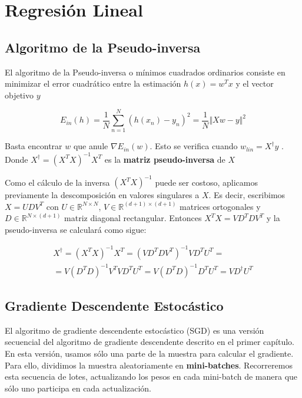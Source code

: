 \chapter{Regresión Lineal}

\section{Algoritmo de la Pseudo-inversa}
El algoritmo de la Pseudo-inversa o mínimos cuadrados ordinarios consiste
en minimizar el error cuadrático entre la estimación $h(x) = w^T x$ y
el vector objetivo $y$

\begin{equation}
E_{in}(h) = \frac{1}{N} \sum_{n=1}^N (h(x_n) - y_n)^2 = \frac{1}{N} \Vert Xw - y\Vert^2
\end{equation}

Basta encontrar $w$ que anule $\nabla E_{in}(w)$. Esto se verifica cuando
$w_{lin} = X^\dagger y$ \cite{LFD}. Donde $X^\dagger = (X^T X)^{-1} X^T$ es la
\textbf{matriz pseudo-inversa} de $X$

Como el cálculo de la inversa $(X^T X)^{-1}$ puede ser costoso, aplicamos
previamente la descomposición en valores singulares a $X$. Es decir, escribimos
$X = U D V^T $ con $U \in \mathbb{R}^{N \times N}$, $V \in \mathbb{R}^{(d+1) \times (d+1)}$
matrices ortogonales y $D \in \mathbb{R}^{N \times (d+1)}$ matriz diagonal rectangular.
Entonces $X^T X = V D^T D V^T$ y la pseudo-inversa se calculará como sigue:

\begin{equation}
\begin{aligned}
X^\dagger = (X^T X)^{-1} X^T = (V D^T D V^T)^{-1} V D^T U^T = \\
= V (D^T D)^{-1} V^T V D^T U^T= V (D^T D)^{-1} D^T U^T = V D^\dagger U^T
\end{aligned}
\end{equation}


\section{Gradiente Descendente Estocástico}

El algoritmo de gradiente descendente estocástico (SGD) es una versión secuencial
del algoritmo de gradiente descendente descrito en el primer capítulo.
En esta versión, usamos sólo una parte de la muestra para calcular el
gradiente. Para ello, dividimos la muestra aleatoriamente en
\textbf{mini-batches}. Recorreremos esta secuencia de lotes, actualizando los
pesos en cada mini-batch de manera que sólo uno participa en cada actualización.

